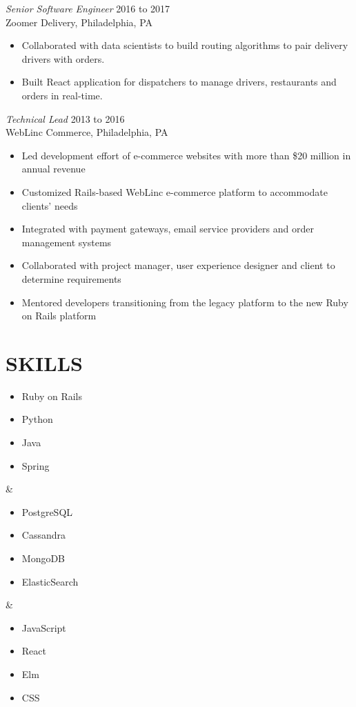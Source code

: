 \documentclass[line]{style}
\begin{document}
\begin{resume}
{\sl Senior Software Engineer} \hfill 2016 to 2017 \\
Zoomer Delivery, Philadelphia, PA
\begin{itemize} \itemsep -2pt
\item Collaborated with data scientists to build routing algorithms to pair delivery drivers with orders.
\item Built React application for dispatchers to manage drivers, restaurants and orders in real-time.
\end{itemize}

{\sl Technical Lead} \hfill 2013 to 2016 \\
WebLinc Commerce, Philadelphia, PA
\begin{itemize} \itemsep -2pt
\item Led development effort of e-commerce websites with more than \$20 million in annual revenue
\item Customized Rails-based WebLinc e-commerce platform to accommodate clients' needs
\item Integrated with payment gateways, email service providers and order management systems
\item Collaborated with project manager, user experience designer and client to determine requirements
\item Mentored developers transitioning from the legacy platform to the new Ruby on Rails platform
\end{itemize}

\section{SKILLS}
\begin{ncolumn}{3}
\begin{itemize} \itemsep -2pt
\item Ruby on Rails
\item Python
\item Java
\item Spring
\end{itemize}
&
\begin{itemize} \itemsep -2pt
\item PostgreSQL
\item Cassandra
\item MongoDB
\item ElasticSearch
\end{itemize}
&
\begin{itemize} \itemsep -2pt
\item JavaScript
\item React
\item Elm
\item CSS
\end{itemize}
\end{ncolumn}


\end{resume}
\end{document}
